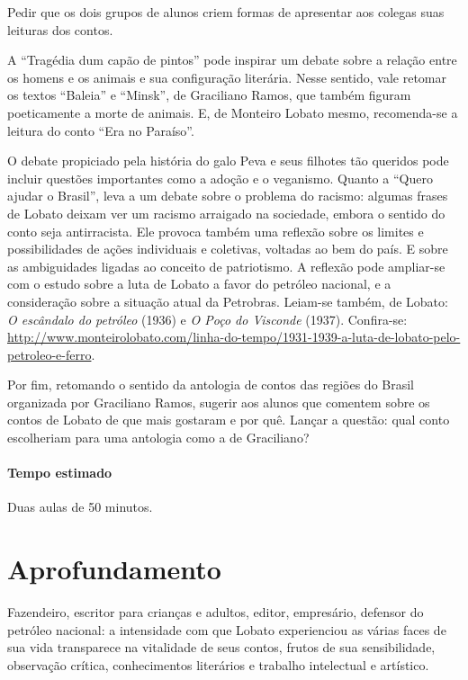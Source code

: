 \documentclass[11pt]{extarticle}
\begin{document}
Pedir que os dois grupos de alunos criem formas de apresentar aos
colegas suas leituras dos contos.

A ``Tragédia dum capão de pintos'' pode inspirar um debate sobre a
relação entre os homens e os animais e sua configuração literária. Nesse
sentido, vale retomar os textos ``Baleia'' e ``Minsk'', de Graciliano
Ramos, que também figuram poeticamente a morte de animais. E, de
Monteiro Lobato mesmo, recomenda-se a leitura do conto ``Era no
Paraíso''.

O debate propiciado pela história do galo Peva e seus filhotes tão
queridos pode incluir questões importantes como a adoção e o veganismo.
Quanto a ``Quero ajudar o Brasil'', leva a um debate sobre o problema do
racismo: algumas frases de Lobato deixam ver um racismo arraigado na
sociedade, embora o sentido do conto seja antirracista. Ele provoca
também uma reflexão sobre os limites e possibilidades de ações
individuais e coletivas, voltadas ao bem do país. E sobre as
ambiguidades ligadas ao conceito de patriotismo. A reflexão pode
ampliar-se com o estudo sobre a luta de Lobato a favor do petróleo
nacional, e a consideração sobre a situação atual da Petrobras. Leiam-se
também, de \textbar{}Lobato: \emph{O escândalo do petróleo} (1936) e
\emph{O Poço do Visconde} (1937). Confira-se:
\url{http://www.monteirolobato.com/linha-do-tempo/1931-1939-a-luta-de-lobato-pelo-petroleo-e-ferro}.

Por fim, retomando o sentido da antologia de contos das regiões do
Brasil organizada por Graciliano Ramos, sugerir aos alunos que comentem
sobre os contos de Lobato de que mais gostaram e por quê. Lançar a
questão: qual conto escolheriam para uma antologia como a de Graciliano?

\paragraph{Tempo estimado} Duas aulas de 50 minutos.

\section{Aprofundamento}


Fazendeiro, escritor para crianças e adultos, editor, empresário,
defensor do petróleo nacional: a intensidade com que Lobato experienciou
as várias faces de sua vida transparece na vitalidade de seus contos,
frutos de sua sensibilidade, observação crítica, conhecimentos
literários e trabalho intelectual e artístico.
\end{document}
